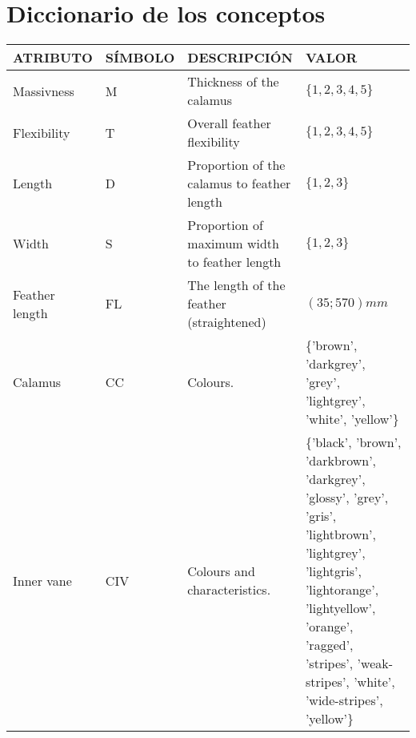 \documentclass[a4paper,12pt]{article}
\begin{document}
\section{Diccionario de los conceptos}
\begin{table}[H]
	\centering
	\begin{tabular}{|p{0.2\linewidth}|p{0.15\linewidth}|p{0.25\linewidth}|p{0.45\linewidth}|}
		\hline
		ATRIBUTO                 & SÍMBOLO & DESCRIPCIÓN                                   & VALOR                                                                                                                                  \\ \hline\hline
		Massivness               & M       & Thickness of the calamus                      & $\{1,2,3,4,5\}$                                                                                                                        \\ \hline
		Flexibility              & T       & Overall feather flexibility                   & $\{1,2,3,4,5\}$                                                                                                                        \\ \hline
		Length                   & D       & Proportion of the calamus to feather length   & $\{1,2,3\}$                                                                                                                            \\ \hline
		Width                    & S       & Proportion of maximum width to feather length & $\{1,2,3\}$                                                                                                                            \\ \hline
		Feather length           & FL      & The length of the feather (straightened)      & $(35;570) mm$                                                                                                                          \\ \hline
		Calamus        & CC      & Colours.                             & \{'brown', 'darkgrey', 'grey', 'lightgrey', 'white', 'yellow'\}                                                                        \\ \hline
		Inner vane     & CIV     & Colours and characteristics.                             & \{'black', 'brown', 'darkbrown', 'darkgrey', 'glossy', 'grey', 'gris', 'lightbrown', 'lightgrey', 'lightgris', 'lightorange', 'lightyellow', 'orange', 'ragged', 'stripes', 'weak-stripes', 'white', 'wide-stripes', 'yellow'\}                             \\ \hline

\end{tabular}
\end{table}
\end{document}
